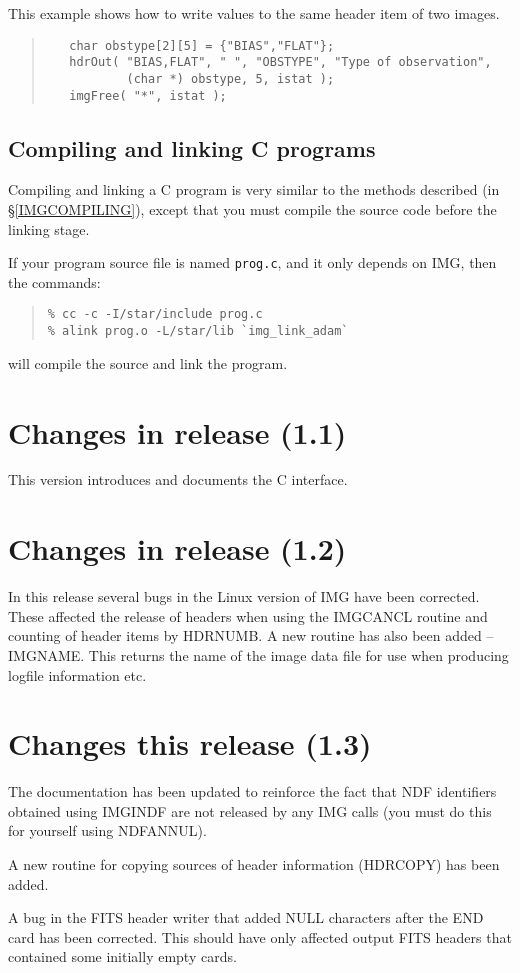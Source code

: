 \documentclass[twoside,11pt]{article}
\newcommand{\hyperref}[4]{#2\ref{#4}#3}
\newcommand{\htmlref}[2]{#1}
\renewcommand{\_}{\texttt{\symbol{95}}}
\newcommand{\myverb}[1]{{\texttt{#1}}}
\newenvironment{code}{\begin{small} \begin{quote}}
                     {\end{quote} \end{small}}
\begin{document}
This example shows how to write values to the same header item of two images.
\begin{code}
\begin{verbatim}
   char obstype[2][5] = {"BIAS","FLAT"};
   hdrOut( "BIAS,FLAT", " ", "OBSTYPE", "Type of observation", 
           (char *) obstype, 5, istat );
   imgFree( "*", istat );
\end{verbatim}
\end{code}

\subsection{Compiling and linking C programs}
Compiling and linking a C program is very similar to the methods
described 
(\hyperref{in the Fortran section}{in \S}{}{IMGCOMPILING}), except
that you must compile the source code before the linking stage. 

If your program source file is named \myverb{prog.c}, and it only
depends on IMG, then the commands:
\begin{code}
\begin{verbatim}
% cc -c -I/star/include prog.c 
% alink prog.o -L/star/lib `img_link_adam`
\end{verbatim}
\end{code}
will compile the source and link the program.

\section{Changes in release (1.1)}

This version introduces and documents the C interface.

\section{Changes in release (1.2)}

In this release several bugs in the Linux version of IMG have been
corrected. These affected the release of headers when using the
\htmlref{IMG\_CANCL}{IMG\_CANCL} routine and counting of header items by 
\htmlref{HDR\_NUMB}{HDR\_NUMB}. A new routine has also been added --
\htmlref{IMG\_NAME}{IMG\_NAME}. This returns the name of the 
image data file for use when producing logfile information etc.

\section{Changes this release (1.3)}
The documentation has been updated to reinforce the fact that NDF
identifiers obtained using \htmlref{IMG\_INDF}{IMG\_INDF} are not
released by any IMG calls (you must do this for yourself using
NDF\_ANNUL). 

A new routine for copying sources of header information
(\htmlref{HDR\_COPY}{HDR\_COPY}) has been added. 

A bug in the FITS header writer that added NULL characters after the
END card has been corrected. This should have only affected output
FITS headers that contained some initially empty cards.
\end{document}
